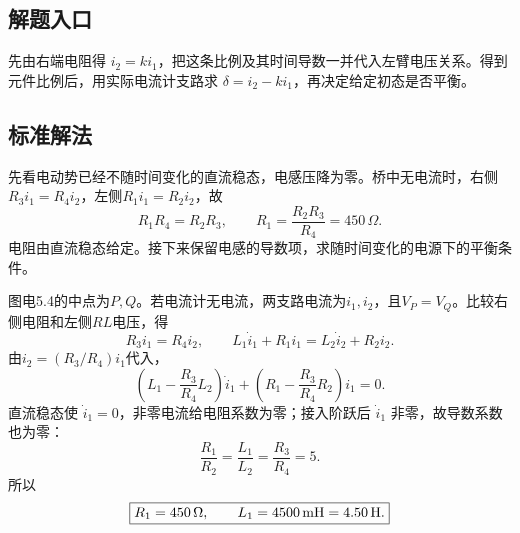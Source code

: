 \documentclass[UTF8,fontset=fandol,a4paper,11pt]{ctexart}
\begin{document}
\subsection*{解题入口}

先由右端电阻得 $i_2=ki_1$，把这条比例及其时间导数一并代入左臂电压关系。得到元件比例后，用实际电流计支路求 $\delta=i_2-ki_1$，再决定给定初态是否平衡。


\subsection*{标准解法}


先看电动势已经不随时间变化的直流稳态，电感压降为零。桥中无电流时，右侧$R_3i_1=R_4i_2$，左侧$R_1i_1=R_2i_2$，故
\[
R_1R_4=R_2R_3,\qquad R_1=\frac{R_2R_3}{R_4}=450\,\Omega.
\]
电阻由直流稳态给定。接下来保留电感的导数项，求随时间变化的电源下的平衡条件。

图电5.4的中点为$P,Q$。若电流计无电流，两支路电流为$i_1,i_2$，且$V_P=V_Q$。比较右侧电阻和左侧$RL$电压，得
\[
 R_3i_1=R_4i_2,\qquad
 L_1\dot i_1+R_1i_1=L_2\dot i_2+R_2i_2 .
\]
由$i_2=(R_3/R_4)i_1$代入，
\[
 \left(L_1-\frac{R_3}{R_4}L_2\right)\dot i_1+
 \left(R_1-\frac{R_3}{R_4}R_2\right)i_1=0 .
\]
直流稳态使 $\dot i_1=0$，非零电流给电阻系数为零；接入阶跃后 $\dot i_1$ 非零，故导数系数也为零：
\[
 \boxed{\frac{R_1}{R_2}=\frac{L_1}{L_2}=\frac{R_3}{R_4}=5.}
\]
所以
\[
 \boxed{R_1=450\,\Omega,\qquad L_1=4500\,{\rm mH}=4.50\,{\rm H}.}
\]
\end{document}
